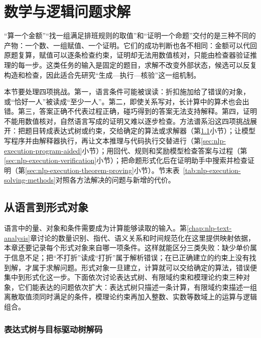 \section{数学与逻辑问题求解}
\label{sec:nlp-execution-solving}

“算一个金额”“找一组满足排班规则的取值”和“证明一个命题”交付的是三种不同的产物：一个数、一组赋值、一个证明。它们的成功判断也各不相同：金额可以代回原题复算，赋值可以逐条检查约束，证明却无法用数值核对，只能由检查器验证推理的每一步。这类任务的输入是固定的题目，求解不改变外部状态，候选可以反复构造和检查，因此适合先研究“生成—执行—核验”这一组机制。

本节要处理四项挑战。第一，语言条件可能被误读：折扣施加给了错误的对象，或“恰好一人”被读成“至少一人”。第二，即使关系写对，长计算中的算术也会出错。第三，答案正确不代表过程正确，碰巧得到的答案无法支持解释。第四，证明不能用数值核对，自然语言写成的证明又难以逐步检查。方法谱系沿这四项挑战展开：把题目转成表达式树或约束，交给确定的算法或求解器（第\ref{sec:nlp-execution-formalization}小节）；让模型写程序并由解释器执行，再让文本推理与代码执行交替进行（第\ref{sec:nlp-execution-program-aided}小节）；用回代、规则和奖励模型检查答案与过程（第\ref{sec:nlp-execution-verification}小节）；把命题形式化后在证明助手中搜索并检查证明（第\ref{sec:nlp-execution-theorem-proving}小节）。节末表~\ref{tab:nlp-execution-solving-methods}对照各方法解决的问题与新增的代价。

\subsection{从语言到形式对象}
\label{sec:nlp-execution-formalization}

语言中的量、对象和条件需要成为计算能够读取的输入。第\ref{chap:nlp-text-analysis}章讨论的数量识别、指代、语义关系和时间规范化在这里提供映射依据，本章还要记录每个形式对象来自哪一项条件。这样就能区分三类失败：缺少单价属于信息不足；把“不打折”读成“打折”属于解析错误；在已正确建立的约束上没有找到解，才属于求解问题。形式对象一旦建立，计算就可以交给确定的算法，错误便集中到形式化这一步。下面依次讨论表达式树、有限域约束和模理论约束三种对象，它们能表达的问题依次扩大：表达式树只描述一条计算，有限域约束描述一组离散取值须同时满足的条件，模理论约束再加入整数、实数等数域上的运算与逻辑组合。

\subsubsection{表达式树与目标驱动树解码}
\label{sec:nlp-execution-expression}

